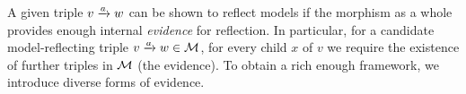 \begin{comment}
\todo[inline]{In fact, we have two versions of model reflection; it currently is unclear which is the ``better''. The difference is that (ordinary) reflection does not impose any requirement on the witnesses, whereas strong reflection requires that the witness of the reflected model is itself a reflected witness of the original model.}
\begin{definition}[strong model reflection]
Let $\cM\of \cT\to\cU$ be a morphism and let $\trip vaw\in\cM$.
\begin{itemize}[topsep=\itemsep]
\item $a$ \emph{reflects a $\hat w$-model $g$ with witness $h$} if $a\I;g\sat \hat v$ with witness $a\P;h$.
	
\item $a$ \emph{strongly reflects models} if $a$ reflects all $\hat w$-model/witness pairs.
		
\item $\cM$ strongly reflects models if $\rtof\cM$ reflects models.
\end{itemize}
\end{definition}
%
\todo[inline]{
The first of these, ``ordinary'' reflection, is the property we are really after; at some point we thought that strong reflection would be necessary for building an inductive proof, but currently that seems not to be the case. If that is born out, we can forget about strong reflection.
}
\end{comment}
%
A given triple $\trip vaw$ can be shown to reflect models if the morphism as a whole provides enough internal \emph{evidence} for reflection. In particular, for a candidate model-reflecting triple $\trip vaw\in \cM$, for every child $x$ of $v$ we require the existence of further triples in ${\mathcal{M}}$ (the evidence). To obtain a rich enough framework, we introduce diverse forms of evidence.

